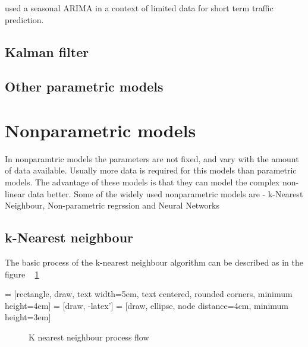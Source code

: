 \citet{kumar2015short} used a seasonal ARIMA in a context of limited data for short term traffic 
prediction.

\subsection{Kalman filter}

\subsection{Other parametric models}

\section{Nonparametric models}
In nonparamtric models the parameters are not fixed, and vary with the amount of data available.
Usually more data is required for this models than parametric models. The advantage of these models
is that they can model the complex non-linear data better. Some of the widely used nonparametric
models are - k-Nearest Neighbour, Non-parametric regrssion and Neural Networks

\subsection{k-Nearest neighbour}

The basic process of the k-nearest neighbour algorithm can be described as in the figure ~
\ref{fig:KnnProcessFlow}

 = [rectangle, draw, text width=5em, text centered, rounded corners, minimum height=4em]
 = [draw, -latex']
 = [draw, ellipse, node distance=4cm, minimum height=3em]

\begin{figure}
\centering
{}
\caption{K nearest neighbour process flow} \label{fig:KnnProcessFlow}
\end{figure}

